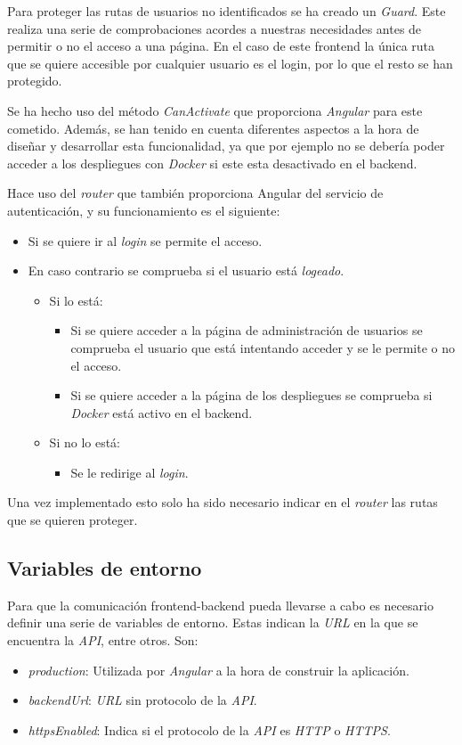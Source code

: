 Para proteger las rutas de usuarios no identificados se ha creado un \textit{Guard}. Este realiza una serie de comprobaciones acordes a nuestras necesidades antes de permitir o no el acceso a una página. En el caso de este frontend la única ruta que se quiere accesible por cualquier usuario es el login, por lo que el resto se han protegido.

Se ha hecho uso del método \textit{CanActivate} que proporciona \textit{Angular} para este cometido. Además, se han tenido en cuenta diferentes aspectos a la hora de diseñar y desarrollar esta funcionalidad, ya que por ejemplo no se debería poder acceder a los despliegues con \textit{Docker} si este esta desactivado en el backend.

Hace uso del \textit{router} que también proporciona Angular del servicio de autenticación, y su funcionamiento es el siguiente:
\begin{itemize}
	\item Si se quiere ir al \textit{login} se permite el acceso.
	\item En caso contrario se comprueba si el usuario está \textit{logeado}.
	\begin{itemize}
		\item Si lo está:
			\begin{itemize}
				\item Si se quiere acceder a la página de administración de usuarios se comprueba el usuario que está intentando acceder y se le permite o no el acceso.
				\item Si se quiere acceder a la página de los despliegues se comprueba si \textit{Docker} está activo en el backend.
			\end{itemize}
		\item Si no lo está:
			\begin{itemize}
				\item Se le redirige al \textit{login}.
			\end{itemize}
	\end{itemize}
\end{itemize}

\bigskip
Una vez implementado esto solo ha sido necesario indicar en el \textit{router} las rutas que se quieren proteger.


\subsection{Variables de entorno}


Para que la comunicación frontend-backend pueda llevarse a cabo es necesario definir una serie de variables de entorno. Estas indican la \textit{URL} en la que se encuentra la \textit{API}, entre otros. Son:
\begin{itemize}
	\item \textit{production}: Utilizada por \textit{Angular} a la hora de construir la aplicación.
	\item \textit{backendUrl}: \textit{URL} sin protocolo de la \textit{API}.
	\item \textit{httpsEnabled}: Indica si el protocolo de la \textit{API} es \textit{HTTP} o \textit{HTTPS}.
\end{itemize}

